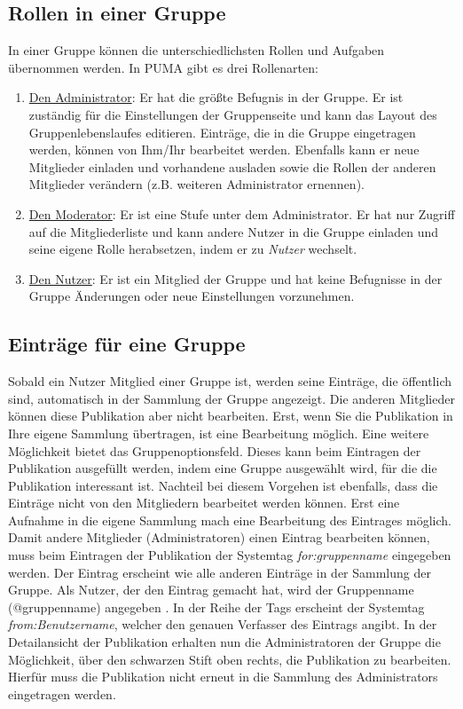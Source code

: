 \subsection{Rollen in einer Gruppe}
\label{RollenInGruppe}
In einer Gruppe können die unterschiedlichsten Rollen und Aufgaben übernommen werden. In PUMA gibt es drei Rollenarten:
\begin{enumerate}
    \item \underline{Den Administrator}: Er hat die größte Befugnis in der Gruppe. Er ist zuständig für die Einstellungen der Gruppenseite und kann das Layout des Gruppenlebenslaufes editieren. Einträge, die in die Gruppe eingetragen werden, können von Ihm/Ihr bearbeitet werden. Ebenfalls kann er neue Mitglieder einladen und vorhandene ausladen sowie die Rollen der anderen Mitglieder verändern (z.B. weiteren Administrator ernennen).
    \item \underline{Den Moderator}: Er ist eine Stufe unter dem Administrator. Er hat nur Zugriff auf die Mitgliederliste und kann andere Nutzer in die Gruppe einladen und seine eigene Rolle herabsetzen, indem er zu \textit{Nutzer} wechselt.
    \item \underline{Den Nutzer}: Er ist ein Mitglied der Gruppe und hat keine Befugnisse in der Gruppe Änderungen oder neue Einstellungen vorzunehmen.
\end{enumerate}
\subsection{Einträge für eine Gruppe}\label{subsec:gruppenfunktion}
Sobald ein Nutzer Mitglied einer Gruppe ist, werden seine Einträge, die öffentlich sind, automatisch in der Sammlung der Gruppe angezeigt. Die anderen Mitglieder können diese Publikation aber nicht bearbeiten. Erst, wenn Sie die Publikation in Ihre eigene Sammlung übertragen, ist eine Bearbeitung möglich. Eine weitere Möglichkeit bietet das Gruppenoptionsfeld. Dieses kann beim Eintragen der Publikation ausgefüllt werden, indem eine Gruppe ausgewählt wird, für die die Publikation interessant ist. Nachteil bei diesem Vorgehen ist ebenfalls, dass die Einträge nicht von den Mitgliedern bearbeitet werden können. Erst eine Aufnahme in die eigene Sammlung mach eine Bearbeitung des Eintrages möglich.\newline  
Damit andere Mitglieder (Administratoren) einen Eintrag bearbeiten können, muss beim Eintragen der Publikation der Systemtag \textit{for:gruppenname} eingegeben werden. Der Eintrag erscheint wie alle anderen Einträge in der Sammlung der Gruppe. Als Nutzer, der den Eintrag gemacht hat, wird der Gruppenname (@gruppenname) angegeben . In der Reihe der Tags erscheint der Systemtag \textit{from:Benutzername}, welcher den genauen Verfasser des Eintrags angibt. In der Detailansicht der Publikation erhalten nun die Administratoren der Gruppe die Möglichkeit, über den schwarzen Stift oben rechts, die Publikation zu bearbeiten. Hierfür muss die Publikation nicht erneut in die Sammlung des Administrators eingetragen werden.
